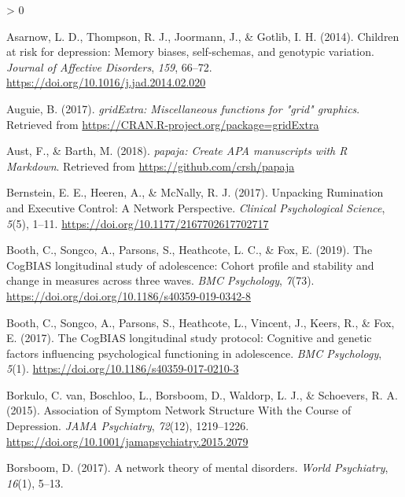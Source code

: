 \documentclass[
  english,
  man]{apa6}
\newlength{\cslhangindent}
\newenvironment{CSLReferences}[2] %
 {%
  \setlength{\parindent}{0pt}
  \ifodd #1 \everypar{\setlength{\hangindent}{\cslhangindent}}\ignorespaces\fi
  \ifnum #2 > 0
  \setlength{\parskip}{#2\baselineskip}
  \fi
 }%
 {}
\begin{document}
\hypertarget{refs}{}
\begin{CSLReferences}{1}{0}
\leavevmode\hypertarget{ref-asarnow_children_2014}{}%
Asarnow, L. D., Thompson, R. J., Joormann, J., \& Gotlib, I. H. (2014). Children at risk for depression: {Memory} biases, self-schemas, and genotypic variation. \emph{Journal of Affective Disorders}, \emph{159}, 66--72. \url{https://doi.org/10.1016/j.jad.2014.02.020}

\leavevmode\hypertarget{ref-R-gridExtra}{}%
Auguie, B. (2017). \emph{gridExtra: Miscellaneous functions for "grid" graphics}. Retrieved from \url{https://CRAN.R-project.org/package=gridExtra}

\leavevmode\hypertarget{ref-R-papaja}{}%
Aust, F., \& Barth, M. (2018). \emph{{papaja}: {Create} {APA} manuscripts with {R Markdown}}. Retrieved from \url{https://github.com/crsh/papaja}

\leavevmode\hypertarget{ref-bernstein_unpacking_2017}{}%
Bernstein, E. E., Heeren, A., \& McNally, R. J. (2017). Unpacking {Rumination} and {Executive} {Control}: {A} {Network} {Perspective}. \emph{Clinical Psychological Science}, \emph{5}(5), 1--11. \url{https://doi.org/10.1177/2167702617702717}

\leavevmode\hypertarget{ref-booth_cogbias_2019}{}%
Booth, C., Songco, A., Parsons, S., Heathcote, L. C., \& Fox, E. (2019). The {CogBIAS} longitudinal study of adolescence: {Cohort} profile and stability and change in measures across three waves. \emph{BMC Psychology}, \emph{7}(73). \url{https://doi.org/doi.org/10.1186/s40359-019-0342-8}

\leavevmode\hypertarget{ref-booth_cogbias_2017}{}%
Booth, C., Songco, A., Parsons, S., Heathcote, L., Vincent, J., Keers, R., \& Fox, E. (2017). The {CogBIAS} longitudinal study protocol: Cognitive and genetic factors influencing psychological functioning in adolescence. \emph{BMC Psychology}, \emph{5}(1). \url{https://doi.org/10.1186/s40359-017-0210-3}

\leavevmode\hypertarget{ref-van_borkulo_association_2015}{}%
Borkulo, C. van, Boschloo, L., Borsboom, D., Waldorp, L. J., \& Schoevers, R. A. (2015). Association of {Symptom} {Network} {Structure} {With} the {Course} of {Depression}. \emph{JAMA Psychiatry}, \emph{72}(12), 1219--1226. \url{https://doi.org/10.1001/jamapsychiatry.2015.2079}

\leavevmode\hypertarget{ref-borsboom_network_2017}{}%
Borsboom, D. (2017). A network theory of mental disorders. \emph{World Psychiatry}, \emph{16}(1), 5--13.


\end{CSLReferences}
\end{document}
